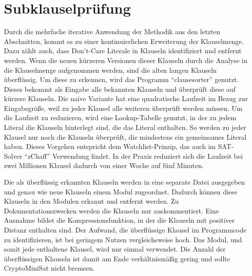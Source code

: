\section{Subklauselprüfung}
\label{sec:ana:subclauses}

Durch die mehrfache iterative Anwendung der Methodik aus den letzten Abschnitten, kommt es zu einer kontinuierlichen Erweiterung der Klauselmenge.
Dazu zählt auch, dass Don't-Care Literale in Klauseln identifiziert und entfernt werden. Wenn die neuen kürzeren Versionen dieser Klauseln durch die
Analyse in die Klauselmenge aufgenommen werden, sind die alten langen Klauseln überflüssig. Um diese zu erkennen, wird das Programm "`clausesorter"'
genutzt. Dieses bekommt als Eingabe alle bekannten Klauseln und überprüft diese auf kürzere Klauseln. Die naive Variante hat eine quadratische
Laufzeit im Bezug zur Eingabegröße, weil zu jeder Klausel alle weiteren überprüft werden müssen. Um die Laufzeit zu reduzieren, wird eine Lookup-Tabelle
genutzt, in der zu jedem Literal die Klauseln hinterlegt sind, die das Literal enthalten. So werden zu jeder Klausel nur noch die Klauseln überprüft,
die mindestens ein gemeinsames Literal haben. Dieses Vorgehen entspricht dem Watchlist-Prinzip, das auch im SAT-Solver "`zChaff"' \cite{zmmm} Verwendung
findet. In der Praxis reduziert sich die Laufzeit bei zwei Millionen Klausel dadurch von einer Woche auf fünf Minuten.

Die als überflüssig erkannten Klauseln werden in eine separate Datei ausgegeben und genau wie neue Klauseln einem Modul zugeordnet. Dadurch können
diese Klauseln in den Modulen erkannt und entfernt werden. Zu Dokumentationszwecken werden die Klauseln nur auskommentiert. Eine Ausnahme bildet
die Kompressionsfunktion, in der die Klauseln mit positiver Distanz enthalten sind. Der Aufwand, die überflüssige Klausel im Programmcode zu identifizieren,
ist bei geringem Nutzen vergleichsweise hoch. Das Modul, und somit jede enthaltene Klausel, wird nur einmal verwendet. Die Anzahl der überflüssigen
Klauseln ist damit am Ende verhältnismäßig gering und sollte CryptoMiniSat nicht bremsen.
